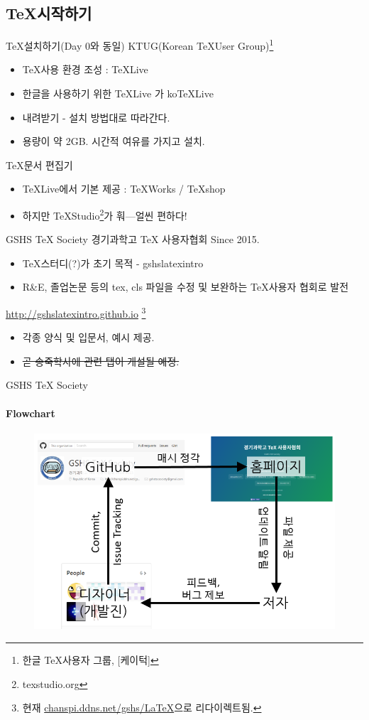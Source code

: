\documentclass[12pt]{beamer}
\begin{document}
\subsection{\TeX 시작하기}
\begin{frame}{\TeX 설치하기(Day 0와 동일)}
	KTUG(Korean \TeX User Group)\footnote{한글 \TeX 사용자 그룹, [케이턱]}
	\begin{itemize}
		\item \TeX 사용 환경 조성 : TeXLive
		\item 한글을 사용하기 위한 TeXLive 가 koTeXLive
		\item 내려받기 - 설치 방법대로 따라간다.
		\item 용량이 약 2GB. 시간적 여유를 가지고 설치.
	\end{itemize}
	\TeX 문서 편집기
	\begin{itemize}
		\item TeXLive에서 기본 제공 : TeXWorks / TeXshop
		\item 하지만 TeXStudio\footnote{texstudio.org}가 훠---얼씬 편하다!
	\end{itemize}
\end{frame}
\begin{frame}{GSHS TeX Society}
	경기과학고 TeX 사용자협회 Since 2015.
	\begin{itemize}
		\item \TeX 스터디(?)가 초기 목적 - gshslatexintro
		\item R\&E, 졸업논문 등의 tex, cls 파일을 수정 및 보완하는 \TeX 사용자 협회로 발전
	\end{itemize}
	\url{http://gshslatexintro.github.io} \footnote{현재 \url{chanspi.ddns.net/gshs/LaTeX}으로 리다이렉트됨.}
	\begin{itemize}
		\item 각종 양식 및 입문서, 예시 제공.
		\item \sout{곧 송죽학사에 관련 탭이 개설될 예정.}
	\end{itemize}
\end{frame}
\begin{frame}{GSHS TeX Society}
	\framesubtitle{Flowchart}
	\begin{figure}[h]
		\centering
		\includegraphics[width=\textwidth]{gshstexsociety.png}
	\end{figure}
\end{frame}
\end{document}
